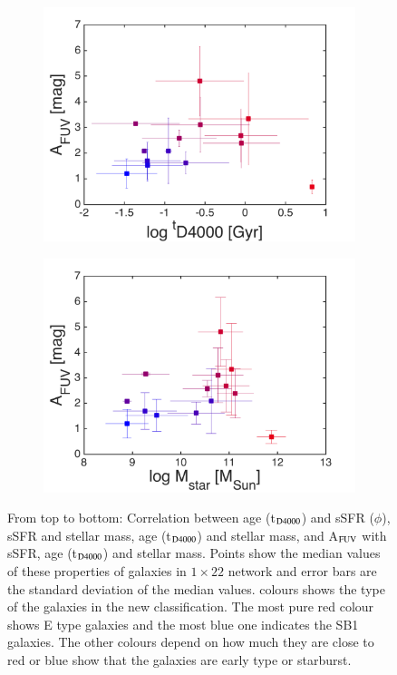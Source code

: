\begin{figure}
\begin{subfigure}[b]{0.5\textwidth}
            \includegraphics[width=\textwidth]{../image_paper2/1d/f5.png}
        \end{subfigure}
       \hfill
        \begin{subfigure}[b]{0.5\textwidth}
            \includegraphics[width=\textwidth]{../image_paper2/1d/f6.png}
        \end{subfigure}
        \caption{From top to bottom: Correlation between age (t$_{\rm {D4000}}$) and sSFR ($\phi$), sSFR and stellar mass, age (t$_{\rm {D4000}}$) and stellar mass, and A$_{\rm {FUV}}$ with sSFR, age (t$_{\rm {D4000}}$) and stellar mass. Points show the median values of these properties of galaxies in $1\times22$ network and error bars are the standard deviation of the median values. colours shows the type of the galaxies in the new classification. The most pure red colour shows E type galaxies and the most blue one indicates the SB1 galaxies. The other colours depend on how much they are close to red or blue show that the galaxies are early type or starburst.}
        \label{fig: props_vs_props}
    \end{figure}
        

